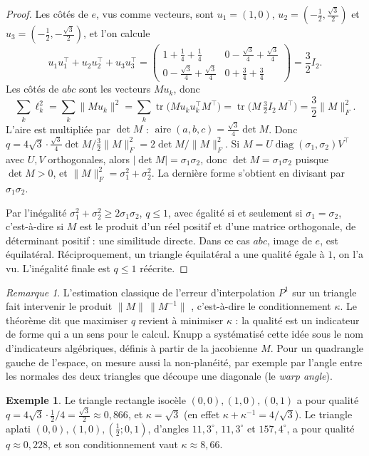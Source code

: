 \documentclass[11pt,a4paper]{article}
\theoremstyle{plain}
\theoremstyle{definition}
\newtheorem{exemple}[theoreme]{Exemple}
\theoremstyle{remark}
\newtheorem{remarque}[theoreme]{Remarque}
\DeclareMathOperator{\tr}{tr}
\DeclareMathOperator{\aire}{aire}
\begin{document}
\begin{proof}
Les côtés de $e$, vus comme vecteurs, sont $u_1=(1,0)$, $u_2=(-\frac12,\frac{\sqrt3}2)$ et $u_3=(-\frac12,-\frac{\sqrt3}2)$, et l'on calcule
\[
  u_1u_1^\top+u_2u_2^\top+u_3u_3^\top=\begin{pmatrix}1+\frac14+\frac14&0-\frac{\sqrt3}4+\frac{\sqrt3}4\\[2pt]0-\frac{\sqrt3}4+\frac{\sqrt3}4&0+\frac34+\frac34\end{pmatrix}=\frac32I_2.
\]
Les côtés de $abc$ sont les vecteurs $Mu_k$, donc
\[
  \sum_k\ell_k^2=\sum_k\|Mu_k\|^2=\sum_k\tr\big(Mu_ku_k^\top M^\top\big)=\tr\Big(M\,\tfrac32I_2\,M^\top\Big)=\frac32\|M\|_F^2.
\]
L'aire est multipliée par $\det M$ : $\aire(a,b,c)=\frac{\sqrt3}4\det M$. Donc $q=4\sqrt3\cdot\frac{\sqrt3}4\det M\big/\frac32\|M\|_F^2=2\det M/\|M\|_F^2$. Si $M=U\operatorname{diag}(\sigma_1,\sigma_2)V^\top$ avec $U,V$ orthogonales, alors $|\det M|=\sigma_1\sigma_2$, donc $\det M=\sigma_1\sigma_2$ puisque $\det M>0$, et $\|M\|_F^2=\sigma_1^2+\sigma_2^2$. La dernière forme s'obtient en divisant par $\sigma_1\sigma_2$.

Par l'inégalité $\sigma_1^2+\sigma_2^2\geq2\sigma_1\sigma_2$, $q\leq1$, avec égalité si et seulement si $\sigma_1=\sigma_2$, c'est-à-dire si $M$ est le produit d'un réel positif et d'une matrice orthogonale, de déterminant positif : une similitude directe. Dans ce cas $abc$, image de $e$, est équilatéral. Réciproquement, un triangle équilatéral a une qualité égale à $1$, on l'a vu. L'inégalité finale est $q\leq1$ réécrite.
\end{proof}

\begin{remarque}
L'estimation classique de l'erreur d'interpolation $P^1$ sur un triangle fait intervenir le produit $\|M\|\,\|M^{-1}\|$ \cite[chapitre 3]{ciarlet}, c'est-à-dire le conditionnement $\kappa$. Le théorème dit que maximiser $q$ revient à minimiser $\kappa$ : la qualité est un indicateur de forme qui a un sens pour le calcul. Knupp \cite{knupp} a systématisé cette idée sous le nom d'indicateurs algébriques, définis à partir de la jacobienne $M$. Pour un quadrangle gauche de l'espace, on mesure aussi la non-planéité, par exemple par l'angle entre les normales des deux triangles que découpe une diagonale (le \emph{warp angle}).
\end{remarque}

\begin{exemple}\label{ex:qualites}
Le triangle rectangle isocèle $(0,0),(1,0),(0,1)$ a pour qualité $q=4\sqrt3\cdot\frac12/4=\frac{\sqrt3}2\approx0{,}866$, et $\kappa=\sqrt3$ (en effet $\kappa+\kappa^{-1}=4/\sqrt3$). Le triangle aplati $(0,0),(1,0),(\frac12;0{,}1)$, d'angles $11{,}3^\circ$, $11{,}3^\circ$ et $157{,}4^\circ$, a pour qualité $q\approx0{,}228$, et son conditionnement vaut $\kappa\approx8{,}66$.
\end{exemple}
\end{document}
